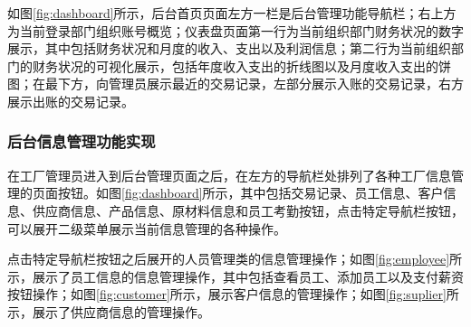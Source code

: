 如图\ref{fig:dashboard}所示，后台首页页面左方一栏是后台管理功能导航栏；右上方为当前登录部门组织账号概览；仪表盘页面第一行为当前组织部门财务状况的数字展示，其中包括财务状况和月度的收入、支出以及利润信息；第二行为当前组织部门的财务状况的可视化展示，包括年度收入支出的折线图以及月度收入支出的饼图；在最下方，向管理员展示最近的交易记录，左部分展示入账的交易记录，右方展示出账的交易记录。

\subsubsection{后台信息管理功能实现}

在工厂管理员进入到后台管理页面之后，在左方的导航栏处排列了各种工厂信息管理的页面按钮。如图\ref{fig:dashboard}所示，其中包括交易记录、员工信息、客户信息、供应商信息、产品信息、原材料信息和员工考勤按钮，点击特定导航栏按钮，可以展开二级菜单展示当前信息管理的各种操作。


点击特定导航栏按钮之后展开的人员管理类的信息管理操作；如图\ref{fig:employee}所示，展示了员工信息的信息管理操作，其中包括查看员工、添加员工以及支付薪资按钮操作；如图\ref{fig:customer}所示，展示客户信息的管理操作；如图\ref{fig:suplier}所示，展示了供应商信息的管理操作。

